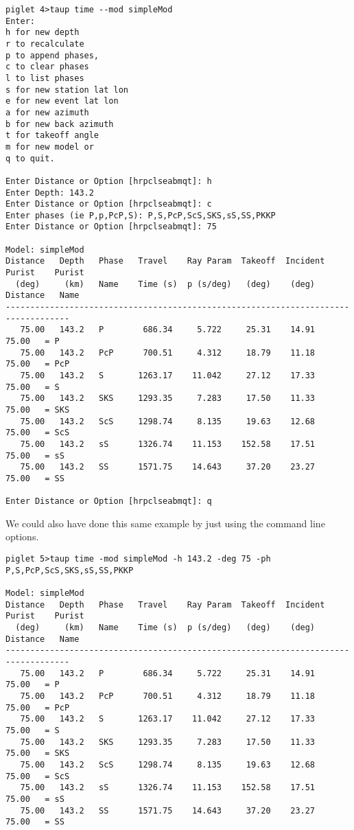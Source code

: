 \begin{verbatim}
piglet 4>taup time --mod simpleMod
Enter:
h for new depth
r to recalculate
p to append phases,
c to clear phases
l to list phases
s for new station lat lon
e for new event lat lon
a for new azimuth
b for new back azimuth
t for takeoff angle
m for new model or
q to quit.

Enter Distance or Option [hrpclseabmqt]: h
Enter Depth: 143.2
Enter Distance or Option [hrpclseabmqt]: c
Enter phases (ie P,p,PcP,S): P,S,PcP,ScS,SKS,sS,SS,PKKP
Enter Distance or Option [hrpclseabmqt]: 75

Model: simpleMod
Distance   Depth   Phase   Travel    Ray Param  Takeoff  Incident  Purist    Purist
  (deg)     (km)   Name    Time (s)  p (s/deg)   (deg)    (deg)   Distance   Name
-----------------------------------------------------------------------------------
   75.00   143.2   P        686.34     5.722     25.31    14.91    75.00   = P
   75.00   143.2   PcP      700.51     4.312     18.79    11.18    75.00   = PcP
   75.00   143.2   S       1263.17    11.042     27.12    17.33    75.00   = S
   75.00   143.2   SKS     1293.35     7.283     17.50    11.33    75.00   = SKS
   75.00   143.2   ScS     1298.74     8.135     19.63    12.68    75.00   = ScS
   75.00   143.2   sS      1326.74    11.153    152.58    17.51    75.00   = sS
   75.00   143.2   SS      1571.75    14.643     37.20    23.27    75.00   = SS

Enter Distance or Option [hrpclseabmqt]: q
\end{verbatim}

We could also have done this same example by just using the command line
options.

\begin{verbatim}
piglet 5>taup time -mod simpleMod -h 143.2 -deg 75 -ph P,S,PcP,ScS,SKS,sS,SS,PKKP

Model: simpleMod
Distance   Depth   Phase   Travel    Ray Param  Takeoff  Incident  Purist    Purist
  (deg)     (km)   Name    Time (s)  p (s/deg)   (deg)    (deg)   Distance   Name
-----------------------------------------------------------------------------------
   75.00   143.2   P        686.34     5.722     25.31    14.91    75.00   = P
   75.00   143.2   PcP      700.51     4.312     18.79    11.18    75.00   = PcP
   75.00   143.2   S       1263.17    11.042     27.12    17.33    75.00   = S
   75.00   143.2   SKS     1293.35     7.283     17.50    11.33    75.00   = SKS
   75.00   143.2   ScS     1298.74     8.135     19.63    12.68    75.00   = ScS
   75.00   143.2   sS      1326.74    11.153    152.58    17.51    75.00   = sS
   75.00   143.2   SS      1571.75    14.643     37.20    23.27    75.00   = SS
\end{verbatim}

